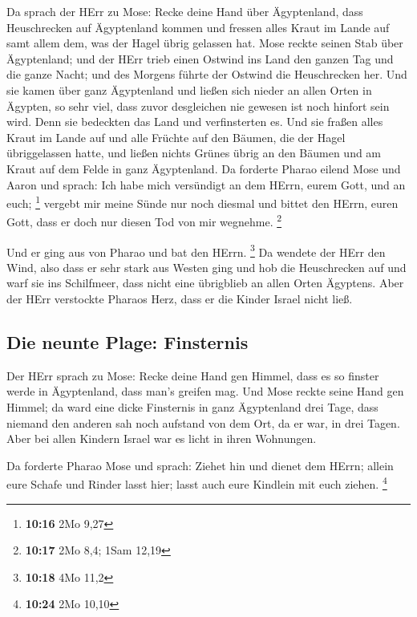  Da sprach der HErr zu Mose: Recke deine Hand über
Ägyptenland, dass Heuschrecken auf Ägyptenland kommen und fressen alles
Kraut im Lande auf samt allem dem, was der Hagel übrig gelassen hat.
 Mose reckte seinen Stab über Ägyptenland; und der HErr
trieb einen Ostwind ins Land den ganzen Tag und die ganze Nacht; und des
Morgens führte der Ostwind die Heuschrecken her.  Und sie
kamen über ganz Ägyptenland und ließen sich nieder an allen Orten in
Ägypten, so sehr viel, dass zuvor desgleichen nie gewesen ist noch
hinfort sein wird.  Denn sie bedeckten das Land und
verfinsterten es. Und sie fraßen alles Kraut im Lande auf und alle
Früchte auf den Bäumen, die der Hagel übriggelassen hatte, und ließen
nichts Grünes übrig an den Bäumen und am Kraut auf dem Felde in ganz
Ägyptenland.  Da forderte Pharao eilend Mose und Aaron
und sprach: Ich habe mich versündigt an dem HErrn, eurem Gott, und an
euch; \footnote{\textbf{10:16} 2Mo 9,27}  vergebt mir
meine Sünde nur noch diesmal und bittet den HErrn, euren Gott, dass er
doch nur diesen Tod von mir wegnehme. \footnote{\textbf{10:17} 2Mo 8,4;
  1Sam 12,19}

 Und er ging aus von Pharao und bat den HErrn.
\footnote{\textbf{10:18} 4Mo 11,2}  Da wendete der HErr
den Wind, also dass er sehr stark aus Westen ging und hob die
Heuschrecken auf und warf sie ins Schilfmeer, dass nicht eine übrigblieb
an allen Orten Ägyptens.  Aber der HErr verstockte
Pharaos Herz, dass er die Kinder Israel nicht ließ.

\hypertarget{die-neunte-plage-finsternis}{%
\subsection{Die neunte Plage:
Finsternis}\label{die-neunte-plage-finsternis}}

 Der HErr sprach zu Mose: Recke deine Hand gen Himmel,
dass es so finster werde in Ägyptenland, dass man's greifen mag.
 Und Mose reckte seine Hand gen Himmel; da ward eine
dicke Finsternis in ganz Ägyptenland drei Tage,  dass
niemand den anderen sah noch aufstand von dem Ort, da er war, in drei
Tagen. Aber bei allen Kindern Israel war es licht in ihren Wohnungen.

 Da forderte Pharao Mose und sprach: Ziehet hin und
dienet dem HErrn; allein eure Schafe und Rinder lasst hier; lasst auch
eure Kindlein mit euch ziehen. \footnote{\textbf{10:24} 2Mo 10,10}

